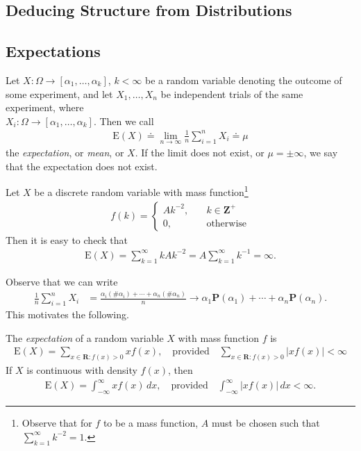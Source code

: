 \begin{definition}
	\chapter{Deducing Structure from Distributions}
	\section{Expectations}
	Let $X: \Omega \to [\alpha_1, \ldots, \alpha_k]$, $k < \infty$ be a random
	variable denoting the outcome of some experiment, and let $X_1, \ldots, 
	X_n$ be independent trials
	of the same experiment, where \\ $X_i:
	\Omega \to [\alpha_1, \ldots, \alpha_k]$. Then we 
	call
	\begin{align*}
		\mathrm{E}(X) \doteq \lim_{n \to \infty} \frac{1}{n} \sum_{i =1}^n X_i \doteq 
		\mu 
	\end{align*}
	the \emph{expectation}, or \emph{mean}, or $X$. If the limit does not exist,
	or $\mu = \pm \infty$, we say that the expectation does not exist.
\end{definition}
\begin{example}
	Let $X$ be a discrete random variable with mass function\footnote{Observe that for $f$ to be a mass function, $A$ must be chosen such that $\sum_{k = 1}^{\infty} k^{-2} = 1$.}
	\begin{align*}
		f(k) = \begin{cases}
			A k^{-2},  \quad &k\in \mathbf{Z}^{+} 
			\\
			0, \quad & \text{otherwise}
		\end{cases}
	\end{align*}
	Then it is easy to check that
	\begin{align*}
		\mathrm{E}(X) = \sum_{k=1}^{\infty} k A k^{-2} = A \sum_{k=1}^{\infty} k^{-1} = 
		\infty.
	\end{align*}
\end{example}
Observe that we can write
\begin{align*}
	\frac{1}{n} \sum_{i = 1}^n X_i
	& = \frac{\alpha_i (\#\alpha_i) + \cdots +
	\alpha_n (\#\alpha_n)}{n}
	\to \alpha_1 \mathbf{P}(\alpha_1) + \cdots + \alpha_n \mathbf{P}(\alpha_n).
\end{align*}
This motivates the following.
\begin{definition}
	The \emph{expectation} of a random variable $X$ with mass function $f$ is
	\begin{align*}
		\mathrm{E}(X) = \sum_{x \in \mathbf{R}: f(x) > 0} x f(x), \quad \text{provided} \quad
		\sum_{x \in \mathbf{R}: f(x) > 0} |x
		f(x) | <
		\infty
	\end{align*}
	If $X$ is continuous with density $f(x)$, then
	\begin{align*}
		\mathrm{E}(X) = \int_{-\infty}^{\infty} x f(x) \, dx, \quad \text{provided} \quad
		\int_{-\infty}^{\infty} |x f(x)| \, dx < \infty.
	\end{align*}
\end{definition}
